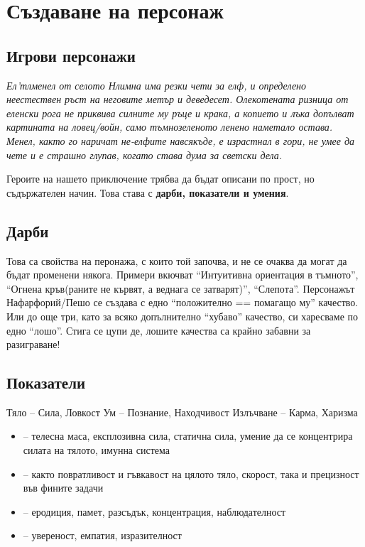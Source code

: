 \section{Създаване на персонаж}
\subsection{Игрови персонажи}
\emph{Ел'тлменел от селото Нлимна има резки чети за елф, и определено неестествен ръст на неговите метър и деведесет. Олекотената ризница от еленски рога не приквива силните му ръце и крака, а копието и лъка допълват картината на ловец/войн, само тъмнозеленото ленено наметало остава. Менел, както го наричат не-елфите навсякъде, е израстнал в гори, не умее да чете и е страшно глупав, когато става дума за светски дела.}

Героите на нашето приключение трябва да бъдат описани по прост, но съдържателен начин. Това става с {\bf дарби, показатели и умения}.

\subsection{Дарби}
Това са свойства на перонажа, с които той започва, и не се очаква да могат да бъдат променени някога. Примери вкючват “Интуитивна ориентация в тъмното”, “Огнена кръв(раните не кървят, а веднага се затварят)”, “Слепота”. Персонажът Нафарфорий/Пешо се създава с едно “положително == помагащо му” качество. Или до още три, като за всяко допълнително “хубаво” качество, си харесваме по едно “лошо”. Стига се цупи де, лошите качества са крайно забавни за разиграване!

\subsection{Показатели}
Тяло – Сила, Ловкост
Ум – Познание, Находчивост
Излъчване – Карма, Харизма

\begin{itemize}
\item {} – телесна маса, експлозивна сила, статична сила, умение да се концентрира силата на тялото, имунна система
\item {} – както повратливост и гъвкавост на цялото тяло, скорост, така и прецизност във фините задачи
\item {} – еродиция, памет, разсъдък, концентрация, наблюдателност
\item {} – увереност, емпатия, изразителност
\end{itemize}

